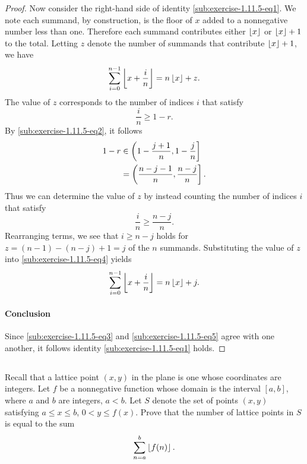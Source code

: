 \documentclass{report}
\begin{document}
\begin{proof}
    Now consider the right-hand side of identity
      \eqref{sub:exercise-1.11.5-eq1}.
    We note each summand, by construction, is the floor of $x$ added to a
      nonnegative number less than one.
    Therefore each summand contributes either $\left\lfloor x\right\rfloor$ or $\left\lfloor x\right\rfloor + 1$ to
      the total.
    Letting $z$ denote the number of summands that contribute $\left\lfloor x\right\rfloor + 1$,
      we have
      \begin{equation}
        \label{sub:exercise-1.11.5-eq4}
        \sum_{i=0}^{n-1} \left\lfloor x + \frac{i}{n}\right\rfloor = n\left\lfloor x\right\rfloor + z.
      \end{equation}
    The value of $z$ corresponds to the number of indices $i$ that satisfy
      $$\frac{i}{n} \geq 1 - r.$$
    By \eqref{sub:exercise-1.11.5-eq2}, it follows
      \begin{align*}
        1 - r
          & \in \left(1 - \frac{j+1}{n}, 1-\frac{j}{n}\right] \\
          & = \left(\frac{n - j - 1}{n}, \frac{n - j}{n}\right].
      \end{align*}
    Thus we can determine the value of $z$ by instead counting the number of
      indices $i$ that satisfy $$\frac{i}{n} \geq \frac{n - j}{n}.$$
    Rearranging terms, we see that $i \geq n - j$ holds for
      $z = (n - 1) - (n - j) + 1 = j$ of the $n$ summands.
    Substituting the value of $z$ into \eqref{sub:exercise-1.11.5-eq4} yields
      \begin{equation}
        \label{sub:exercise-1.11.5-eq5}
        \sum_{i=0}^{n-1} \left\lfloor x + \frac{i}{n}\right\rfloor = n\left\lfloor x\right\rfloor + j.
      \end{equation}

  \paragraph{Conclusion}%

    Since \eqref{sub:exercise-1.11.5-eq3} and \eqref{sub:exercise-1.11.5-eq5}
      agree with one another, it follows identity
      \eqref{sub:exercise-1.11.5-eq1} holds.

\end{proof}

\subsection{}%
\label{sub:exercise-1.11.6}

Recall that a lattice point $(x, y)$ in the plane is one whose coordinates are
  integers.
Let $f$ be a nonnegative function whose domain is the interval $[a, b]$, where
  $a$ and $b$ are integers, $a < b$.
Let $S$ denote the set of points $(x, y)$ satisfying $a \leq x \leq b$,
  $0 < y \leq f(x)$.
Prove that the number of lattice points in $S$ is equal to the sum
  $$\sum_{n=a}^b \left\lfloor f(n)\right\rfloor.$$
\end{document}
